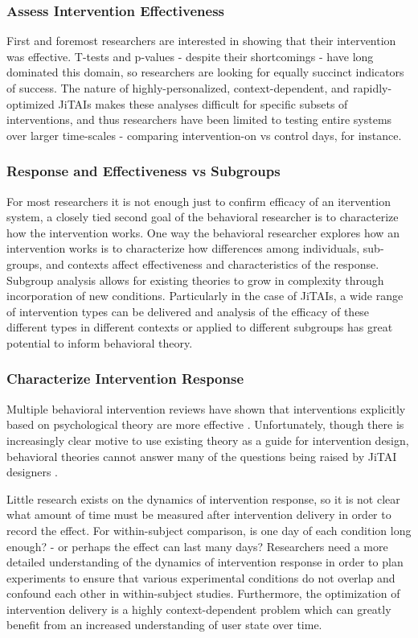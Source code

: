 \subsubsection{Assess Intervention Effectiveness}
First and foremost researchers are interested in showing that their intervention was effective.
T-tests and p-values - despite their shortcomings \cite{nuzzo2014} - have long dominated this domain, so researchers are looking for equally succinct indicators of success.
The nature of highly-personalized, context-dependent, and rapidly-optimized JiTAIs makes these analyses difficult for specific subsets of interventions, and thus researchers have been limited to testing entire systems over larger time-scales - comparing intervention-on vs control days, for instance.

\subsubsection{Response and Effectiveness vs Subgroups}
For most researchers it is not enough just to confirm efficacy of an itervention system, a closely tied second goal of the behavioral researcher is to characterize how the intervention works.
One way the behavioral researcher explores how an intervention works is to characterize how differences among individuals, sub-groups, and contexts affect effectiveness and characteristics of the response.
Subgroup analysis allows for existing theories to grow in complexity through incorporation of new conditions.
Particularly in the case of JiTAIs, a wide range of intervention types can be delivered and analysis of the efficacy of these different types in different contexts or applied to different subgroups has great potential to inform behavioral theory.


\subsubsection{Characterize Intervention Response}
Multiple behavioral intervention reviews have shown that interventions explicitly based on psychological theory are more effective \cite{glanz2010}.
Unfortunately, though there is increasingly clear motive to use existing theory as a guide for intervention design, behavioral theories cannot answer many of the questions being raised by JiTAI designers \cite{riley2011}.

Little research exists on the dynamics of intervention response, so it is not clear what amount of time must be measured after intervention delivery in order to record the effect.
For within-subject comparison, is one day of each condition long enough? - or perhaps the effect can last many days?
Researchers need a more detailed understanding of the dynamics of intervention response in order to plan experiments to ensure that various experimental conditions do not overlap and confound each other in within-subject studies.
Furthermore, the optimization of intervention delivery is a highly context-dependent problem which can greatly benefit from an increased understanding of user state over time.

